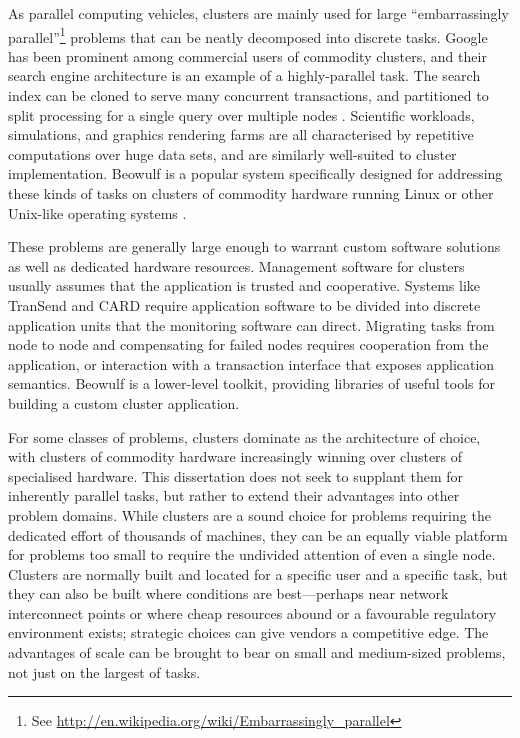 As parallel computing vehicles, clusters are mainly used for large ``embarrassingly parallel''\footnote{See \url{http://en.wikipedia.org/wiki/Embarrassingly_parallel}} problems that can be neatly decomposed into discrete tasks. Google has been prominent among commercial users of commodity clusters, and their search engine architecture is an example of a highly-parallel task. The search index can be cloned to serve many concurrent transactions, and partitioned to split processing for a single query over multiple nodes \cite{barroso03}. Scientific workloads, simulations, and graphics rendering farms are all characterised by repetitive computations over huge data sets, and are similarly well-suited to cluster implementation. Beowulf is a popular system specifically designed for addressing these kinds of tasks on clusters of commodity hardware running Linux or other Unix-like operating systems \cite{ridge}.

These problems are generally large enough to warrant custom software solutions as well as dedicated hardware resources. Management software for clusters usually assumes that the application is trusted and cooperative. Systems like TranSend \cite{fox} and CARD \cite{anderson97} require application software to be divided into discrete application units that the monitoring software can direct. Migrating tasks from node to node and compensating for failed nodes requires cooperation from the application, or interaction with a transaction interface that exposes application semantics. Beowulf \cite{ridge} is a lower-level toolkit, providing libraries of useful tools for building a custom cluster application.

For some classes of problems, clusters dominate as the architecture of choice, with clusters of commodity hardware increasingly winning over clusters of specialised hardware. This dissertation does not seek to supplant them for inherently parallel tasks, but rather to extend their advantages into other problem domains. While clusters are a sound choice for problems requiring the dedicated effort of thousands of machines, they can be an equally viable platform for problems too small to require the undivided attention of even a single node. Clusters are normally built and located for a specific user and a specific task, but they can also be built where conditions are best---perhaps near network interconnect points or where cheap resources abound or a favourable regulatory environment exists; strategic choices can give vendors a competitive edge. The advantages of scale can be brought to bear on small and medium-sized problems, not just on the largest of tasks.


